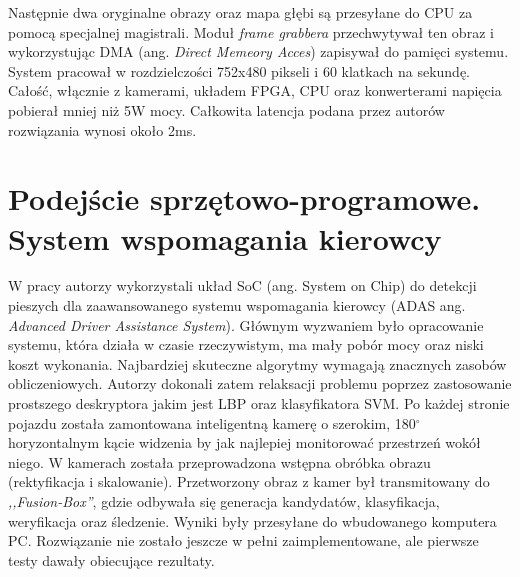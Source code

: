 Następnie dwa oryginalne obrazy oraz mapa głębi są przesyłane do CPU za pomocą specjalnej magistrali.
Moduł \textit{frame grabbera} przechwytywał ten obraz i wykorzystując DMA (ang. \textit{Direct Memeory Acces}) zapisywał do pamięci systemu.
System pracował w rozdzielczości 752x480 pikseli i 60 klatkach na sekundę. 
Całość, włącznie z kamerami, układem FPGA, CPU oraz konwerterami napięcia pobierał mniej niż 5W mocy. 
Całkowita latencja podana przez autorów rozwiązania wynosi około 2ms.


\section{Podejście sprzętowo-programowe. System wspomagania kierowcy}
W pracy \cite{piao2016real} autorzy wykorzystali układ SoC (ang. System on Chip) do detekcji pieszych dla zaawansowanego systemu wspomagania kierowcy (ADAS ang. \textit{Advanced Driver Assistance System}). 
Głównym wyzwaniem było opracowanie systemu, która działa w czasie rzeczywistym, ma mały pobór mocy oraz niski koszt wykonania. 
Najbardziej skuteczne algorytmy wymagają znacznych zasobów obliczeniowych. %
Autorzy dokonali zatem relaksacji problemu poprzez zastosowanie prostszego deskryptora jakim jest LBP oraz klasyfikatora SVM. 
Po każdej stronie pojazdu została zamontowana inteligentną kamerę o szerokim, 180$^\circ$ horyzontalnym kącie widzenia by jak najlepiej monitorować przestrzeń wokół niego. 
W kamerach została przeprowadzona wstępna obróbka obrazu (rektyfikacja i skalowanie). 
Przetworzony obraz z kamer był transmitowany do \textit{,,Fusion-Box''}, gdzie odbywała się generacja kandydatów, klasyfikacja, weryfikacja oraz śledzenie. 
Wyniki były przesyłane do wbudowanego komputera PC. 
Rozwiązanie nie zostało jeszcze w pełni zaimplementowane, ale pierwsze testy dawały obiecujące rezultaty.

